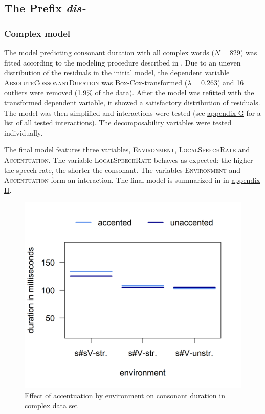 \subsection{The Prefix \textit{dis-} }


\subsubsection{Complex model}

The model predicting consonant duration with all complex words ($N=829$) was fitted according to the modeling procedure described in . Due to an uneven distribution of the residuals in the initial model, the dependent variable \textsc{AbsoluteConsonantDuration} was Box-Cox-transformed ($\lambda = 0.263$) and 16 outliers were removed (1.9\% of the data). After the model was refitted with the transformed dependent variable, it showed a satisfactory distribution of residuals. The model was then simplified and interactions were tested (see \hyperref[Appendix G Summaries of tested interactions in experimental study]{appendix G} for a list of all tested interactions). The decomposability variables were tested individually.

The final model features three variables, \textsc{Environment}, \textsc{LocalSpeechRate} and \textsc{Accentuation}. The variable \textsc{LocalSpeechRate} behaves as expected: the higher the speech rate, the shorter the consonant. The variables \textsc{Environment} and \textsc{Accentuation} form an interaction. The final model is summarized in  in \hyperref[Appendix H: Model Summaries Experiment]{appendix H}.






\begin{figure} [t!]
	\centering
	\includegraphics [scale=0.5] {images/Experiment/DisModelInterEnvAcc}
	\caption{Effect of accentuation by environment on consonant duration in complex data set}
	\label{fig:NumNasal disComplex experiment}
\end{figure}




